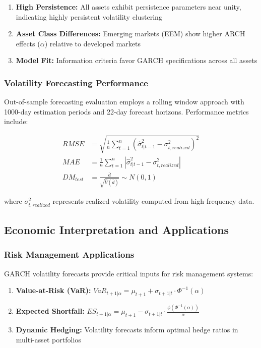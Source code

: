 \documentclass[12pt,a4paper]{article}
\begin{document}
\begin{enumerate}
    \item \textbf{High Persistence:} All assets exhibit persistence parameters near unity, indicating highly persistent volatility clustering
    \item \textbf{Asset Class Differences:} Emerging markets (EEM) show higher ARCH effects ($\alpha$) relative to developed markets
    \item \textbf{Model Fit:} Information criteria favor GARCH specifications across all assets
\end{enumerate}

\subsubsection{Volatility Forecasting Performance}

Out-of-sample forecasting evaluation employs a rolling window approach with 1000-day estimation periods and 22-day forecast horizons. Performance metrics include:

\begin{align}
RMSE &= \sqrt{\frac{1}{n}\sum_{t=1}^{n}(\hat{\sigma}_{t|t-1}^2 - \sigma_{t,realized}^2)^2} \\
MAE &= \frac{1}{n}\sum_{t=1}^{n}|\hat{\sigma}_{t|t-1}^2 - \sigma_{t,realized}^2| \\
DM_{test} &= \frac{\bar{d}}{\sqrt{\hat{V}(\bar{d})}} \sim N(0,1)
\end{align}

where $\sigma_{t,realized}^2$ represents realized volatility computed from high-frequency data.

\subsection{Economic Interpretation and Applications}

\subsubsection{Risk Management Applications}

GARCH volatility forecasts provide critical inputs for risk management systems:

\begin{enumerate}
    \item \textbf{Value-at-Risk (VaR):} $VaR_{t+1|\alpha} = \mu_{t+1} + \sigma_{t+1|t} \cdot \Phi^{-1}(\alpha)$
    \item \textbf{Expected Shortfall:} $ES_{t+1|\alpha} = \mu_{t+1} - \sigma_{t+1|t} \cdot \frac{\phi(\Phi^{-1}(\alpha))}{\alpha}$
    \item \textbf{Dynamic Hedging:} Volatility forecasts inform optimal hedge ratios in multi-asset portfolios
\end{enumerate}
\end{document}
